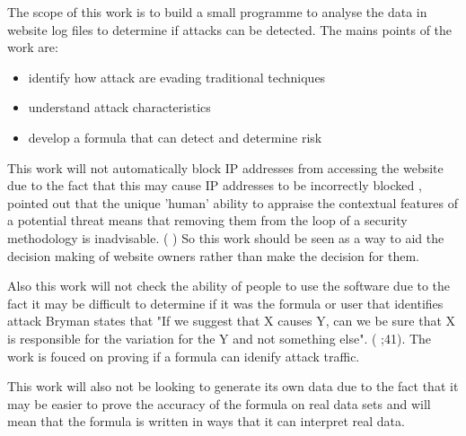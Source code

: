 The scope of this work is to build a small programme to analyse the data in website log files to determine if attacks can be detected. The mains points of the work are:
\begin{itemize}
    \item identify how attack are evading traditional techniques 
    \item understand attack characteristics
    \item develop a formula that can detect and determine risk
\end{itemize}

This work will not automatically block IP addresses from accessing the website due to the fact that this may cause IP addresses to be incorrectly blocked \citeauthor{TargetedCyberSecurity}, pointed out that the unique 'human' ability to appraise the contextual features of a potential threat means that removing them from the loop of a security methodology is inadvisable. (\cite{TargetedCyberSecurity} ) So this work should be seen as a way to aid the decision making of website owners rather than make the decision for them. 

Also this work will not check the ability of people to use the software due to the fact it may be difficult to determine if it was the formula or user that identifies attack Bryman states that "If we suggest that X causes Y, can we be sure that X is responsible for the variation for the Y and not something else". (\citeauthor{bryman_2016} \citeyear{bryman_2016};41). The work is fouced on proving if a formula can idenify attack traffic.


This work will also not be looking to generate its own data due to the fact that it may be easier to prove the accuracy of the formula on real data sets and will mean that the formula is written in ways that it can interpret real data.
